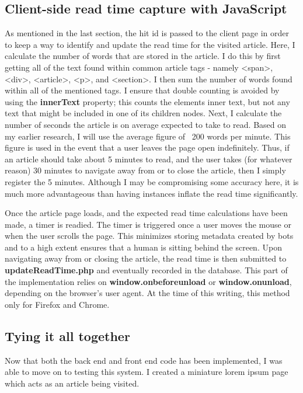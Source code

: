 \documentclass[12pt]{article}
\begin{document}
\subsection{Client-side read time capture with JavaScript}
As mentioned in the last section, the hit id is passed to the client page in order to keep a way to identify and update the read time for the visited article. Here, I calculate the number of words that are stored in the article. I do this by first getting all of the text found within common article tags - namely <span>, <div>, <article>, <p>, and <section>. I then sum the number of words found within all of the mentioned tags. I ensure that double counting is avoided by using the \textbf{innerText} property; this counts the elements inner text, but not any text that might be included in one of its children nodes. Next, I calculate the number of seconds the article is on average expected to take to read. Based on my earlier research, I will use the average figure of ~200 words per minute. This figure is used in the event that a user leaves the page open indefinitely. Thus, if an article should take about 5 minutes to read, and the user takes (for whatever reason) 30 minutes to navigate away from or to close the article, then I simply register the 5 minutes. Although I may be compromising some accuracy here, it is much more advantageous than having instances inflate the read time significantly.

Once the article page loads, and the expected read time calculations have been made, a timer is readied. The timer is triggered once a user moves the mouse or when the user scrolls the page. This minimizes storing metadata created by bots and to a high extent ensures that a human is sitting behind the screen. Upon navigating away from or closing the article, the read time is then submitted to \textbf{updateReadTime.php} and eventually recorded in the database. This part of the implementation relies on \textbf{window.onbeforeunload} or \textbf{window.onunload}, depending on the browser's user agent. At the time of this writing, this method only for Firefox and Chrome.
 
\vfill

\subsection{Tying it all together}
Now that both the back end and front end code has been implemented, I was able to move on to testing this system. I created a miniature lorem ipsum page which acts as an article being visited. \\
\end{document}
